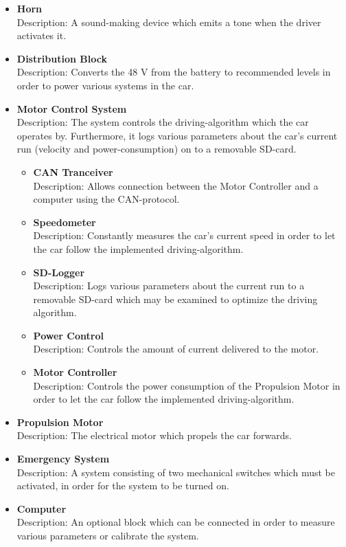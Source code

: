 \begin{itemize}
\begin{itemize}
	\end{itemize}
	\item \textbf{Horn}\\
	Description: A sound-making device which emits a tone when the driver activates it.
	\item \textbf{Distribution Block}\\ 
	Description: Converts the 48 V from the battery to recommended levels in order to power various systems in the car.
	\item \textbf{Motor Control System}\\
	Description: The system controls the driving-algorithm which the car operates by. Furthermore, it logs various parameters about the car's current run (velocity and power-consumption) on to a removable SD-card.
	\begin{itemize}
		\item \textbf{CAN Tranceiver}\\
		Description: Allows connection between the Motor Controller and a computer using the CAN-protocol.
		\item \textbf{Speedometer}\\
		Description: Constantly measures the car's current speed in order to let the car follow the implemented driving-algorithm.
		\item \textbf{SD-Logger}\\
		Description: Logs various parameters about the current run to a removable SD-card which may be examined to optimize the driving algorithm.
		\item \textbf{Power Control}\\
		Description: Controls the amount of current delivered to the motor.
		\item \textbf{Motor Controller}\\
		Description: Controls the power consumption of the Propulsion Motor in order to let the car follow the implemented driving-algorithm. 
	\end{itemize}
	\item \textbf{Propulsion Motor}\\
	Description: The electrical motor which propels the car forwards.
	\item \textbf{Emergency System}\\
	Description: A system  consisting of two mechanical switches  which must be activated, in order for the system to be turned on.
	\item \textbf{Computer}\\
	Description: An optional block which can be connected in order to measure various parameters or calibrate the system.
\end{itemize}